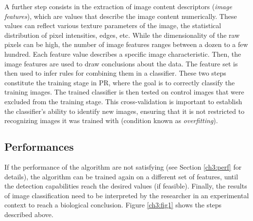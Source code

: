 A further step consists in the extraction of image content descriptors (\textit{image features}),
which are values that describe the image content numerically. These values can
reflect various texture parameters of the image, the statistical distribution of pixel intensities, edges, etc.
While the dimensionality of the raw pixels can be high, the number of image features ranges
between a dozen to a few hundred. Each feature value describes a specific image characteristic.
Then, the image features are used to draw conclusions about the data.
The feature set is then used to infer rules for combining them in a classifier.
These two steps constitute the training stage in PR, where the goal is to correctly
classify the training images. The trained classifier is then tested on control images
that were excluded from the training stage.
This cross-validation is important to establish the classifier's ability to identify
new images, ensuring that it is not restricted to recognizing images it was
trained with (condition known as \textit{overfitting}).

\vspace{0.5cm}

\subsection{Performances}

If the performance of the algorithm are not satisfying (see Section \ref{ch3:perf} for details), the algorithm can be trained again on a different set of features, until the
detection capabilities reach the desired values (if feasible).
Finally, the results of image classification
need to be interpreted by the researcher in
an experimental context to reach a biological conclusion. 
Figure \ref{ch3:fig1} shows the steps described above.

\clearpage


